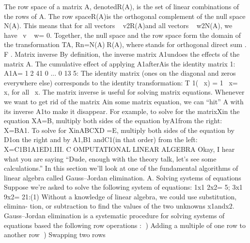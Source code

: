The row space of a matrix A, denotedR\left(A\right), is the set of linear
combinations of the rows of A. The row spaceR\left(A\right)is the orthogonal
complement of the null space N\left(A\right). This means that for all vectors
~ v2R\left(A\right)and all vectors ~ w2N\left(A\right), we have~ v~ w= 0. Together, the
null space and the row space form the domain of the transformation TA,
Rn=N\left(A\right)R\left(A\right), wherestands for orthogonal direct sum .
F . Matrix inverse
By deﬁnition, the inverse matrix A 1undoes the effects of the matrix A.
The cumulative effect of applying A 1afterAis the identity matrix 1:
A 1A= 12
41 0
...
0 13
5:
The identity matrix \left(ones on the diagonal and zeros everywhere else\right)
corresponds to the identity transformation: T 1\left(~ x\right) = 1~ x=~ x, for all~ x.
The matrix inverse is useful for solving matrix equations. Whenever we
want to get rid of the matrix Ain some matrix equation, we can “hit” A
with its inverse A 1to make it disappear. For example, to solve for the
matrixXin the equation XA=B, multiply both sides of the equation
byA 1from the right: X=BA 1. To solve for XinABCXD =E,
multiply both sides of the equation by D 1on the right and by A 1,B 1
andC 1\left(in that order\right) from the left: X=C 1B 1A 1ED 1.III. C OMPUTATIONAL LINEAR ALGEBRA
Okay, I hear what you are saying “Dude, enough with the theory talk, let’s
see some calculations.” In this section we’ll look at one of the fundamental
algorithms of linear algebra called Gauss–Jordan elimination.
A. Solving systems of equations
Suppose we’re asked to solve the following system of equations:
1x1\+ 2x2= 5;
3x1\+ 9x2= 21:\left(1\right)
Without a knowledge of linear algebra, we could use substitution, elimina-
tion, or subtraction to ﬁnd the values of the two unknowns x1andx2.
Gauss–Jordan elimination is a systematic procedure for solving systems
of equations based the following row operations :
\right) Adding a multiple of one row to another row
\right) Swapping two rows

